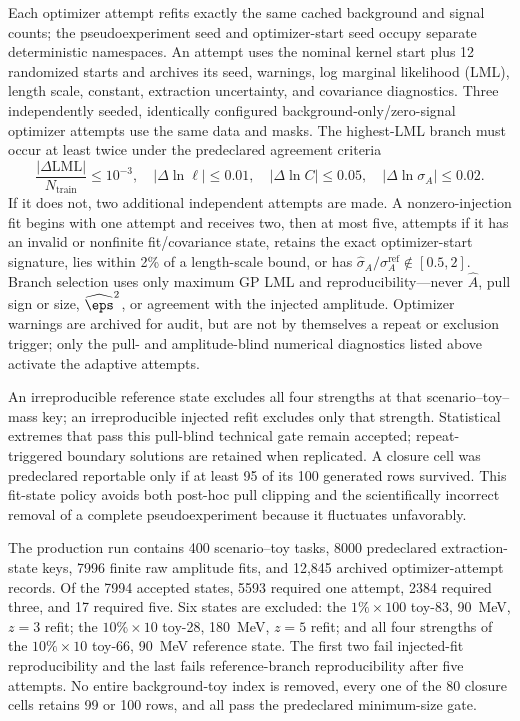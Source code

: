 Each optimizer attempt refits exactly the same cached background and signal counts;
the pseudoexperiment seed and optimizer-start seed occupy separate deterministic
namespaces.  An attempt uses the nominal kernel start plus 12 randomized starts and
archives its seed, warnings, log marginal likelihood (LML), length scale, constant,
extraction uncertainty, and covariance diagnostics.  Three independently seeded,
identically configured background-only/zero-signal optimizer attempts use the same
data and masks.  The highest-LML branch
must occur at least twice under the predeclared agreement criteria
\begin{equation}
 \frac{|\Delta\mathrm{LML}|}{N_{\mathrm{train}}}\leq10^{-3},\quad
 |\Delta\ln\ell|\leq0.01,\quad
 |\Delta\ln C|\leq0.05,\quad
 |\Delta\ln\sigma_A|\leq0.02.
 \label{eq:v4p6-branch-replication}
\end{equation}
If it does not, two additional independent attempts are made.  A nonzero-injection
fit begins with one attempt and receives two, then at most five, attempts if it has an
invalid or nonfinite fit/covariance state, retains the exact optimizer-start signature, lies
within 2\% of a length-scale bound, or has
$\widehat\sigma_A/\sigma_A^{\mathrm{ref}}\notin[0.5,2]$.  Branch selection uses only
maximum GP LML and reproducibility---never $\widehat A$, pull sign or size,
$\widehat\eps^2$, or agreement with the injected amplitude.
Optimizer warnings are archived for audit, but are not by themselves a repeat or
exclusion trigger; only the pull- and amplitude-blind numerical diagnostics listed above
activate the adaptive attempts.

An irreproducible reference state excludes all four strengths at that
scenario--toy--mass key; an irreproducible injected refit excludes only that strength.
Statistical extremes that pass this pull-blind technical gate remain accepted;
repeat-triggered boundary solutions are retained when replicated.  A closure cell
was predeclared reportable only if at least 95 of its 100 generated rows survived.
This fit-state policy avoids both post-hoc pull clipping and the scientifically
incorrect removal of a complete pseudoexperiment because it fluctuates unfavorably.

The production run contains 400 scenario--toy tasks, 8000 predeclared extraction-state
keys, 7996 finite raw amplitude fits, and 12,845 archived optimizer-attempt records.
Of the 7994 accepted states,
5593 required one attempt, 2384 required three, and 17 required five.  Six states are
excluded: the $1\%\times100$ toy-83, 90~MeV, $z=3$ refit; the $10\%\times10$
toy-28, 180~MeV, $z=5$ refit; and all four strengths of the $10\%\times10$ toy-66,
90~MeV reference state.  The first two fail injected-fit reproducibility and the last
fails reference-branch reproducibility after five attempts.  No entire background-toy
index is removed, every one of the 80 closure cells retains 99 or 100 rows, and all pass the
predeclared minimum-size gate.

